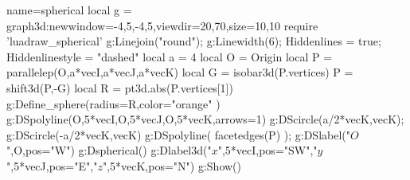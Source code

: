\begin{luadraw}{name=spherical}
local g = graph3d:new{window={-4,5,-4,5},viewdir={20,70},size={10,10}}
require 'luadraw_spherical'
g:Linejoin("round"); g:Linewidth(6); Hiddenlines = true; Hiddenlinestyle = "dashed"
local a = 4
local O = Origin
local P = parallelep(O,a*vecI,a*vecJ,a*vecK)
local G = isobar3d(P.vertices)
P = shift3d(P,-G)
local R = pt3d.abs(P.vertices[1])
g:Define_sphere({radius=R,color="orange"} )
g:DSpolyline({{O,5*vecI},{O,5*vecJ},{O,5*vecK}},{arrows=1})
g:DScircle({a/2*vecK,vecK}); g:DScircle({-a/2*vecK,vecK})
g:DSpolyline( facetedges(P) ); g:DSlabel("$O$",O,{pos="W"})
g:Dspherical()
g:Dlabel3d("$x$",5*vecI,{pos="SW"},"$y$",5*vecJ,{pos="E"},"$z$",5*vecK,{pos="N"})
g:Show()
\end{luadraw}
